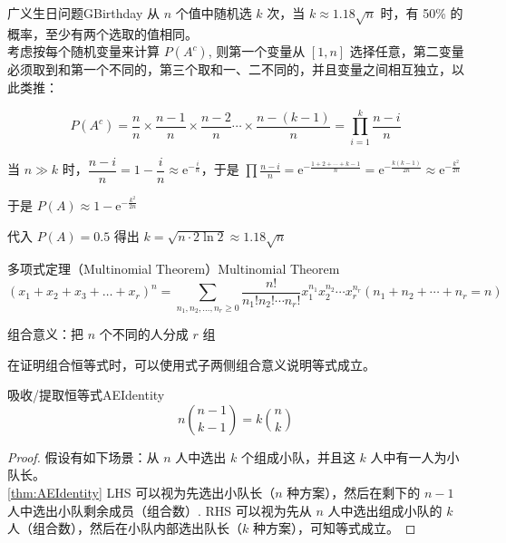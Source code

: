 \begin{theorem}{广义生日问题}{GBirthday}
    从 $n$ 个值中随机选 $k$ 次，当 $k \approx 1.18 \sqrt{n}$ 时，有 50\% 的概率，至少有两个选取的值相同。\\
    
    考虑按每个随机变量来计算 $P(A^c)$, 则第一个变量从 $[1, n]$ 选择任意，第二变量必须取到和第一个不同的，第三个取和一、二不同的，并且变量之间相互独立，以此类推：
    
    $$
    P(A^c) = \frac{n}{n} \times \frac{n - 1}{n} \times \frac{n - 2}{n} \cdots \times \frac{n - (k - 1)}{n} = \prod_{i = 1}^{k} \frac{n - i}{n}
    $$
    
    当 $n \gg k$ 时，$\dfrac{n - i}{n} = 1 - \dfrac{i}{n} \approx \mathrm{e}^{-\frac{i}{n}}$，于是 $\prod \frac{n - i}{n} = \mathrm{e}^{-\frac{1 + 2 + \cdots + k - 1}{n}} = \mathrm{e}^{-\frac{k (k - 1)}{2n}} \approx \mathrm{e}^{-\frac{k^2}{2n}}$
    
    于是 $P(A) \approx 1 - \mathrm{e}^{-\frac{k^2}{2n}}$
    
    代入 $P(A) = 0.5$ 得出 $k = \sqrt{n \cdot 2 \ln 2} \approx 1.18 \sqrt{n}$
    
\end{theorem}

\begin{theorem}{多项式定理（Multinomial Theorem）}{Multinomial Theorem}
    $$
    (x_1 + x_2 + x_3 + \dots + x_r)^n = \sum_{n_1, n_2, \dots, n_r \geqslant 0} \frac{n!}{n_1 ! n_2 ! \cdots n_r !} x_1^{n_1} x_2^{n_2} \cdots x_r^{n_r} (n_1 + n_2 + \cdots + n_r = n)
    $$
    
    组合意义：把 $n$ 个不同的人分成 $r$ 组
\end{theorem}

在证明组合恒等式时，可以使用式子两侧组合意义说明等式成立。

\begin{theorem}{吸收/提取恒等式}{AEIdentity}
    $$
    n \binom{n - 1}{k - 1} = k \binom{n}{k}
    $$
\end{theorem}

\begin{proof}
    假设有如下场景：从 $n$ 人中选出 $k$ 个组成小队，并且这 $k$ 人中有一人为小队长。\\
    
    \autoref{thm:AEIdentity} LHS 可以视为先选出小队长（$n$ 种方案），然后在剩下的 $n - 1$ 人中选出小队剩余成员（组合数）. RHS 可以视为先从 $n$ 人中选出组成小队的 $k$ 人（组合数），然后在小队内部选出队长（$k$ 种方案），可知等式成立。
\end{proof}

